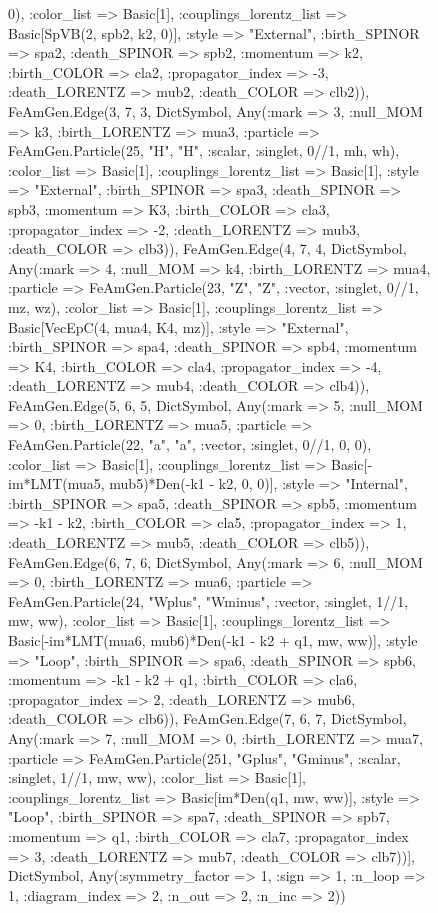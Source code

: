 \documentclass{revtex4}
\begin{document}
\begin{figure}[!htb]
\begin{center}
{0), :color_list => Basic[1], :couplings_lorentz_list => Basic[SpVB(2, spb2, k2, 0)], :style => "External", :birth_SPINOR => spa2, :death_SPINOR => spb2, :momentum => k2, :birth_COLOR => cla2, :propagator_index => -3, :death_LORENTZ => mub2, :death_COLOR => clb2)), FeAmGen.Edge(3, 7, 3, Dict{Symbol, Any}(:mark => 3, :null_MOM => k3, :birth_LORENTZ => mua3, :particle => FeAmGen.Particle(25, "H", "H", :scalar, :singlet, 0//1, mh, wh), :color_list => Basic[1], :couplings_lorentz_list => Basic[1], :style => "External", :birth_SPINOR => spa3, :death_SPINOR => spb3, :momentum => K3, :birth_COLOR => cla3, :propagator_index => -2, :death_LORENTZ => mub3, :death_COLOR => clb3)), FeAmGen.Edge(4, 7, 4, Dict{Symbol, Any}(:mark => 4, :null_MOM => k4, :birth_LORENTZ => mua4, :particle => FeAmGen.Particle(23, "Z", "Z", :vector, :singlet, 0//1, mz, wz), :color_list => Basic[1], :couplings_lorentz_list => Basic[VecEpC(4, mua4, K4, mz)], :style => "External", :birth_SPINOR => spa4, :death_SPINOR => spb4, :momentum => K4, :birth_COLOR => cla4, :propagator_index => -4, :death_LORENTZ => mub4, :death_COLOR => clb4)), FeAmGen.Edge(5, 6, 5, Dict{Symbol, Any}(:mark => 5, :null_MOM => 0, :birth_LORENTZ => mua5, :particle => FeAmGen.Particle(22, "a", "a", :vector, :singlet, 0//1, 0, 0), :color_list => Basic[1], :couplings_lorentz_list => Basic[-im*LMT(mua5, mub5)*Den(-k1 - k2, 0, 0)], :style => "Internal", :birth_SPINOR => spa5, :death_SPINOR => spb5, :momentum => -k1 - k2, :birth_COLOR => cla5, :propagator_index => 1, :death_LORENTZ => mub5, :death_COLOR => clb5)), FeAmGen.Edge(6, 7, 6, Dict{Symbol, Any}(:mark => 6, :null_MOM => 0, :birth_LORENTZ => mua6, :particle => FeAmGen.Particle(24, "Wplus", "Wminus", :vector, :singlet, 1//1, mw, ww), :color_list => Basic[1], :couplings_lorentz_list => Basic[-im*LMT(mua6, mub6)*Den(-k1 - k2 + q1, mw, ww)], :style => "Loop", :birth_SPINOR => spa6, :death_SPINOR => spb6, :momentum => -k1 - k2 + q1, :birth_COLOR => cla6, :propagator_index => 2, :death_LORENTZ => mub6, :death_COLOR => clb6)), FeAmGen.Edge(7, 6, 7, Dict{Symbol, Any}(:mark => 7, :null_MOM => 0, :birth_LORENTZ => mua7, :particle => FeAmGen.Particle(251, "Gplus", "Gminus", :scalar, :singlet, 1//1, mw, ww), :color_list => Basic[1], :couplings_lorentz_list => Basic[im*Den(q1, mw, ww)], :style => "Loop", :birth_SPINOR => spa7, :death_SPINOR => spb7, :momentum => q1, :birth_COLOR => cla7, :propagator_index => 3, :death_LORENTZ => mub7, :death_COLOR => clb7))], Dict{Symbol, Any}(:symmetry_factor => 1, :sign => 1, :n_loop => 1, :diagram_index => 2, :n_out => 2, :n_inc => 2)) 
}
\end{center}
\end{figure}
\end{document}
